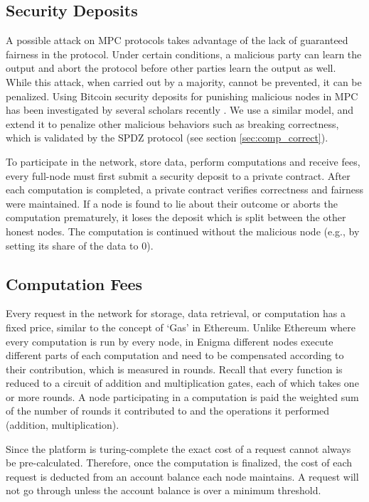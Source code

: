\documentclass{article} \usepackage{nips13submit_e,times}
\begin{document}
\subsection{Security Deposits}

A possible attack on MPC protocols takes advantage of the lack of guaranteed fairness in the protocol. Under certain conditions, a malicious party can learn the output and abort the protocol before other parties learn the output as well. While this attack, when carried out by a majority, cannot be prevented, it can be penalized. Using Bitcoin security deposits for punishing malicious nodes in MPC has been investigated by several scholars recently \cite{deposits1, deposits2}. We use a similar model, and extend it to penalize other malicious behaviors such as breaking correctness, which is validated by the SPDZ protocol (see section \ref{sec:comp_correct}).

To participate in the network, store data, perform computations and receive fees, every full-node must first submit a security deposit to a private contract. After each computation is completed, a private contract verifies correctness and fairness were maintained. If a node is found to lie about their outcome or aborts the computation prematurely, it loses the deposit which is split between the other honest nodes. The computation is continued without the malicious node (e.g., by setting its share of the data to 0).


\subsection{Computation Fees}

Every request in the network for storage, data retrieval, or computation has a fixed price, similar to the concept of ‘Gas’ in Ethereum. Unlike Ethereum where every computation is run by every node, in Enigma different nodes execute different parts of each computation and need to be compensated according to their contribution, which is measured in rounds. Recall that every function is reduced to a circuit of addition and multiplication gates, each of which takes one or more rounds. A node participating in a computation is paid the weighted sum of the number of rounds it contributed to and the operations it performed (addition, multiplication).



Since the platform is turing-complete the exact cost of a request cannot always be pre-calculated. Therefore, once the computation is finalized, the cost of each request is deducted from an account balance each node maintains. A request will not go through unless the account balance is over a minimum threshold.
\end{document}
